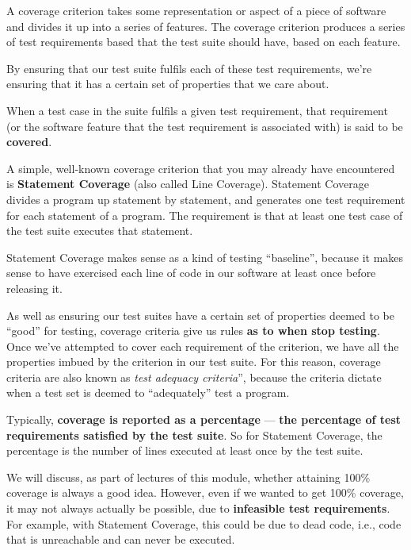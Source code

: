
A coverage criterion takes some representation or aspect of a piece of software
and divides it up into a series of features. The coverage criterion produces a
series of test requirements based that the test suite should have, based on each
feature. 

By ensuring that our test suite fulfils each of these test requirements, we're
ensuring that it has a certain set of properties that we care about. 


When a test case in the suite fulfils a given test requirement, that requirement
(or the software feature that the test requirement is associated with) is said
to be {\bf covered}. 


A simple, well-known coverage criterion that you may already have encountered is
{\bf Statement Coverage} (also called Line Coverage). Statement Coverage divides
a program up statement by statement, and generates one test requirement for each
statement of a program. The requirement is that at least one test case of the
test suite executes that statement. 

Statement Coverage makes sense as a kind of testing ``baseline'', because it
makes sense to have exercised each line of code in our software at least once
before releasing it. 

As well as ensuring our test suites have a certain set of properties deemed to
be ``good'' for testing, coverage criteria give us rules {\bf as to when stop
testing}. Once we've attempted to cover each requirement of the criterion, we
have all the properties imbued by the criterion in our test suite. For this
reason, coverage criteria are also known as {\it test adequacy criteria}'',
because the criteria dictate when a test set is deemed to ``adequately'' test a
program. 


Typically, {\bf coverage is reported as a percentage} --- {\bf the percentage of
test requirements satisfied by the test suite}. So for Statement Coverage, the
percentage is the number of lines executed at least once by the test suite.

We will discuss, as part of lectures of this module, whether attaining 100\%
coverage is always a good idea. However, even if we wanted to get 100\%
coverage, it may not always actually be possible, due to {\bf infeasible test
requirements}. For example, with Statement Coverage, this could be due to dead
code, i.e., code that is unreachable and can never be executed. 

